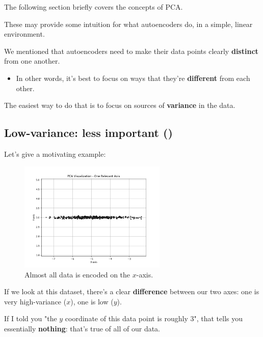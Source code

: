         \phantom{}

        \begin{remark*}
            The following section briefly covers the concepts of PCA. 

            These may provide some intuition for what autoencoders do, in a simple, linear environment.
        \end{remark*}

        We mentioned that autoencoders need to make their data points clearly \textbf{distinct} from one another.

        \begin{itemize}
            \item In other words, it's best to focus on ways that they're \textbf{different} from each other.
        \end{itemize}

        The easiest way to do that is to focus on sources of \textbf{variance} in the data.

        \subsection{Low-variance: less important ()}

            Let's give a motivating example:

            \begin{figure}[H]
                \centering
                \includegraphics[width=70mm,scale=0.5]{images/autoencoder_images/pca_x_axis.png}
                \caption*{Almost all data is encoded on the $x$-axis.}
            \end{figure}

            If we look at this dataset, there's a clear \textbf{difference} between our two axes: one is very high-variance ($x$), one is low ($y$).

            If I told you "the $y$ coordinate of this data point is roughly 3", that tells you essentially \textbf{nothing}: that's true of all of our data.

